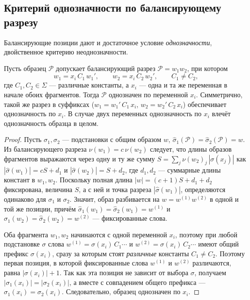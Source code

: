 \documentclass[14pt, russian]{scrartcl}
\begin{document}
\subsection{Критерий однозначности по балансирующему разрезу}
\label{sec:unamb-cut}

Балансирующие позиции дают и достаточное условие \textit{однозначности}, двойственное
критерию неоднозначности.

\begin{Lemma}
\label{lem:balcut}
Пусть образец $\mathcal{P}$ допускает балансирующий разрез $\mathcal{P} = w_1 w_2$,
при котором
\begin{equation}
w_1 = x_i\, C_1\, w_1', \qquad w_2 = x_i\, C_2\, w_2', \qquad C_1 \neq C_2,
\end{equation}
где $C_1, C_2 \in \Sigma$ --- различные константы, а $x_i$ --- одна и та же
переменная в начале обоих фрагментов. Тогда $\mathcal{P}$ однозначен по переменной
$x_i$. Симметрично, такой же разрез в суффиксах ($w_1 = w_1'\, C_1\, x_i$,
$w_2 = w_2'\, C_2\, x_i$) обеспечивает однозначность по $x_i$. В случае двух
переменных однозначность по $x_i$ влечёт однозначность образца в целом.
\end{Lemma}

\begin{proof}
Пусть $\sigma_1, \sigma_2$ --- подстановки с общим образом $w$,
$\hat\sigma_1(\mathcal{P}) = \hat\sigma_2(\mathcal{P}) = w$. Из балансирующего разреза
$\nu(w_1) = c\,\nu(w_2)$ следует, что длины образов фрагментов выражаются через одну и
ту же сумму $S = \sum_j \nu(w_2)_j\,|\sigma(x_j)|$ как
$|\hat\sigma(w_1)| = c S + d_1$ и $|\hat\sigma(w_2)| = S + d_2$, где $d_1, d_2$ ---
суммарные длины констант в $w_1, w_2$. Поскольку полная длина
$|w| = (c+1)S + d_1 + d_2$ фиксирована, величина $S$, а с ней и точка разреза
$|\hat\sigma(w_1)|$, определяются одинаково для $\sigma_1$ и $\sigma_2$. Значит, образ
разбивается на $w = w^{(1)} w^{(2)}$ в одной и той же позиции, причём
$\hat\sigma_1(w_1) = \hat\sigma_2(w_1) = w^{(1)}$ и
$\hat\sigma_1(w_2) = \hat\sigma_2(w_2) = w^{(2)}$ --- фиксированные слова.

Оба фрагмента $w_1, w_2$ начинаются с одной переменной $x_i$, поэтому при любой
подстановке $\sigma$ слова $w^{(1)} = \sigma(x_i)\, C_1 \cdots$ и
$w^{(2)} = \sigma(x_i)\, C_2 \cdots$ имеют общий префикс $\sigma(x_i)$, сразу за
которым стоят \textit{различные} константы $C_1 \neq C_2$. Поэтому первая позиция, в
которой фиксированные слова $w^{(1)}$ и $w^{(2)}$ различаются, равна
$|\sigma(x_i)| + 1$. Так как эта позиция не зависит от выбора $\sigma$, получаем
$|\sigma_1(x_i)| = |\sigma_2(x_i)|$, а вместе с совпадением общего префикса ---
$\sigma_1(x_i) = \sigma_2(x_i)$. Следовательно, образец однозначен по $x_i$.
\end{proof}
\end{document}
